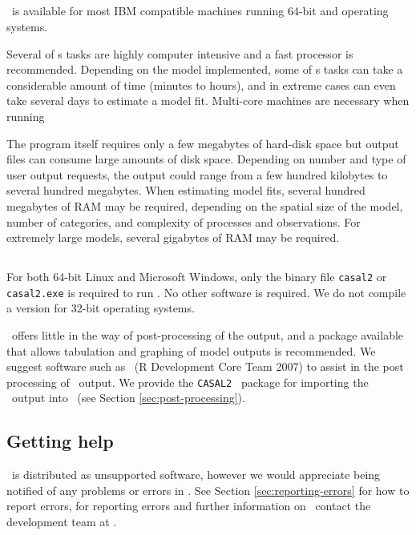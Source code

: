 \subsection{}
\CNAME\ is available for most IBM compatible machines running 64-bit  and  operating systems.

Several of \CNAME s tasks are highly computer intensive and a fast processor is recommended. Depending on the model implemented, some of \CNAME s tasks can take a considerable amount of time (minutes to hours), and in extreme cases can even take several days to estimate a model fit. Multi-core machines are necessary when running \CNAME\

The program itself requires only a few megabytes of hard-disk space but output files can consume large amounts of disk space. Depending on number and type of user output requests, the output could range from a few hundred kilobytes to several hundred megabytes. When estimating model fits, several hundred megabytes of RAM may be required, depending on the spatial size of the model, number of categories, and complexity of processes and observations. For extremely large models, several gigabytes of RAM may be required. 

\subsection{}

For both 64-bit Linux and Microsoft Windows, only the binary file \texttt{casal2} or \texttt{casal2.exe} is required to run \CNAME . No other software is required. We do not compile a version for 32-bit operating systems. 

\CNAME\ offers little in the way of  post-processing of the output, and a package available that allows tabulation and graphing of model outputs is recommended. We suggest software such as \href{http://www.r-project.org}{\R}\ (R Development Core Team 2007) to assist in the post processing of \CNAME\ output. We provide the \texttt{CASAL2} \R\ package for importing the \CNAME\ output into \R\ (see Section \ref{sec:post-processing}).

\subsection{Getting help}
\CNAME\ is distributed as unsupported software, however we would appreciate being notified of any problems or errors in \CNAME. See Section \ref{sec:reporting-errors} for how to report errors, for reporting errors and further information on \CNAME\ contact the development team at \email.

